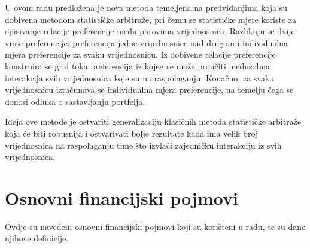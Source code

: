 \documentclass[lmodern, utf8, diplomski, numeric]{fer}
\begin{document}
  U ovom radu predložena je nova metoda temeljena na predviđanjima koja su dobivena metodom statističke arbitraže, pri čemu se statističke mjere koriste za opisivanje relacije preferencije među parovima vrijednosnica.
  Razlikuju se dvije vrste preferencije: preferencija jedne vrijednosnice nad drugom i individualna mjera preferencije za svaku vrijednosnicu.
  Iz dobivene relacije preferencije konstruira se graf toka preferencija iz kojeg se može proučiti međusobna interakcija svih vrijednosnica koje su na raspolaganju.
  Konačno, za svaku vrijednosnicu izračunava se individualna mjera preferencije, na temelju čega se donosi odluka o sastavljanju portfelja.
  
  Ideja ove metode je ostvariti generalizaciju klasičnih metoda statističke arbitraže koja će biti robusnija i ostvarivati bolje rezultate kada ima velik broj vrijednosnica na raspolaganju time što izvlači zajedničku interakciju iz svih vrijednosnica.
  

  \chapter{Osnovni financijski pojmovi}
  Ovdje su navedeni osnovni financijski pojmovi koji su korišteni u radu, te su dane njihove definicije.
  
\end{document}
